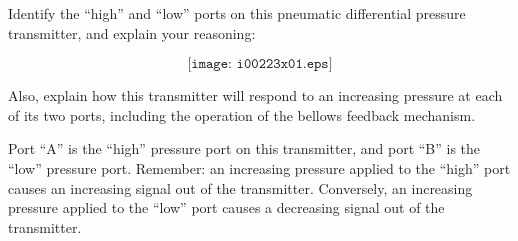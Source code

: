 

Identify the ``high'' and ``low'' ports on this pneumatic differential pressure transmitter, and explain your reasoning:

$$\texttt{[image: i00223x01.eps]}$$

Also, explain how this transmitter will respond to an increasing pressure at each of its two ports, including the operation of the bellows feedback mechanism.







Port ``A'' is the ``high'' pressure port on this transmitter, and port ``B'' is the ``low'' pressure port.  Remember: an increasing pressure applied to the ``high'' port causes an increasing signal out of the transmitter.  Conversely, an increasing pressure applied to the ``low'' port causes a decreasing signal out of the transmitter.











